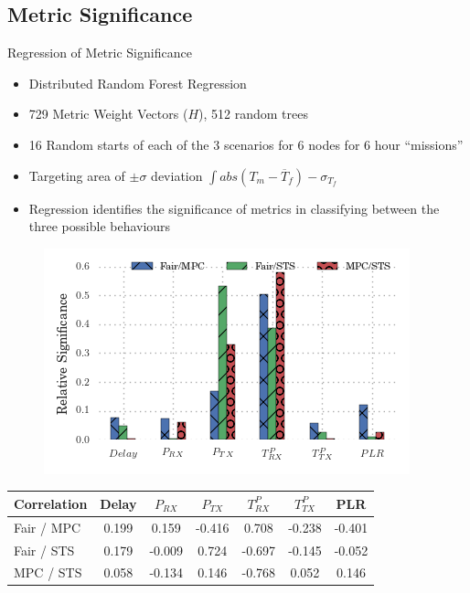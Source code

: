 \documentclass{beamer}
\begin{document}
\subsection{Metric Significance}
\begin{frame}[allowframebreaks]{Regression of Metric Significance}
  \begin{itemize}
    \item Distributed Random Forest Regression \autocite{Breiman2001} 
    \item 729 Metric Weight Vectors ($H$), 512 random trees
    \item 16 Random starts of each of the 3 scenarios for 6 nodes for 6 hour ``missions''
    \item Targeting area of $\pm\sigma$ deviation $\int abs(T_m - \overline T_f) - \sigma_{T_f}$
    \item Regression identifies the significance of metrics in classifying between the three possible behaviours
  \end{itemize}

  \framebreak

  \begin{figure}
    \centering
    \includegraphics[width=0.95\linewidth]{img/MaliciousSelfishMetricFactors}
    \label{fig:malselfactors}
  \end{figure}
  \vspace{-30pt}%
  \begin{table}[h]
    \begin{center}
      \small
      \bgroup
      \def\arraystretch{1.2}%
      \setlength\tabcolsep{4pt}%
      \begin{tabular}{l|CCCCCC}
        \toprule
        Correlation      & Delay & $P_{RX}$ & $P_{TX}$ & $T^P_{RX}$ & $T^P_{TX}$ & PLR \\
        \midrule
        Fair / MPC       & 0.199 &  0.159   & -0.416  &  0.708   & -0.238   & -0.401\\
        Fair / STS       & 0.179 &  -0.009  &  0.724  & -0.697   & -0.145   & -0.052\\
        MPC / STS        & 0.058 &  -0.134  &  0.146  & -0.768   &  0.052   &  0.146\\
        \bottomrule
      \end{tabular}
      \egroup
    \end{center}
  \end{table}


\end{frame}
\end{document}
